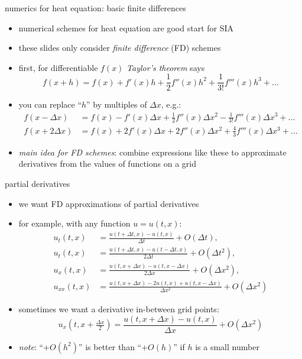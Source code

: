 \begin{frame}{numerics for heat equation: basic finite differences}

\begin{itemize}
\item numerical schemes for heat equation are good start for SIA
\item these slides only consider \emph{finite difference} (FD) schemes

\bigskip
\item first, for differentiable $f(x)$ \emph{Taylor's theorem} says
	$$f(x+h) = f(x) + f'(x) h + \frac{1}{2} f''(x) h^2 + \frac{1}{3!} f'''(x) h^3 + \dots$$
\normalsize
\item you can replace ``$h$'' by multiples of $\Delta x$, e.g.:
\small
\begin{align*}
f(x-\Delta x) &= f(x) - f'(x) \Delta x + \frac{1}{2} f''(x) \Delta x^2 - \frac{1}{3!} f'''(x) \Delta x^3 + \dots \\
f(x+2\Delta x) &= f(x) + 2 f'(x) \Delta x + 2 f''(x) \Delta x^2 + \frac{4}{3} f'''(x) \Delta x^3 + \dots
\end{align*}
\normalsize
\item \emph{main idea for FD schemes}:  combine expressions like these to approximate derivatives from the values of functions on a grid
\end{itemize}
\end{frame}


\begin{frame}{partial derivatives}

\begin{itemize}
\item we want FD approximations of partial derivatives
\item for example, with any function $u=u(t,x)$:
\small
\begin{align*}
u_t(t,x) &= \frac{u(t+\Delta t,x) - u(t,x)}{\Delta t} + O(\Delta t), \\
u_t(t,x) &= \frac{u(t+\Delta t,x) - u(t-\Delta t,x)}{2\Delta t} + O(\Delta t^2), \\
u_x(t,x) &= \frac{u(t,x+\Delta x) - u(t,x-\Delta x)}{2\Delta x} + O(\Delta x^2), \\
u_{xx}(t,x) &= \frac{u(t,x+\Delta x) - 2 u(t,x) + u(t,x-\Delta x)}{\Delta x^2} + O(\Delta x^2)
\end{align*}
\normalsize
\item sometimes we want a derivative in-between grid points:
\small
	$$u_x(t,x+\tfrac{\Delta x}{2}) = \frac{u(t,x+\Delta x) - u(t,x)}{\Delta x} + O(\Delta x^2)$$
\normalsize
\item \emph{note}: ``$+O(h^2)$'' is better than ``$+O(h)$'' if $h$ is a small number
\end{itemize}
\end{frame}


